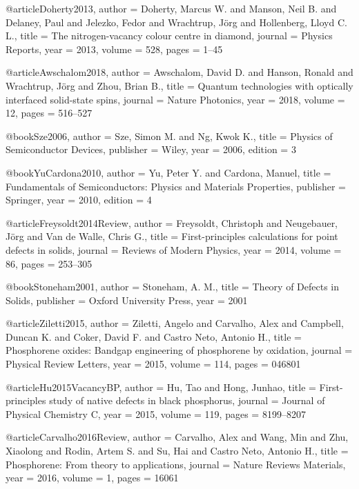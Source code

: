 @article{Doherty2013,
  author = {Doherty, Marcus W. and Manson, Neil B. and Delaney, Paul and Jelezko, Fedor and Wrachtrup, J{\"o}rg and Hollenberg, Lloyd C. L.},
  title = {The nitrogen-vacancy colour centre in diamond},
  journal = {Physics Reports},
  year = {2013},
  volume = {528},
  pages = {1--45}
}

@article{Awschalom2018,
  author = {Awschalom, David D. and Hanson, Ronald and Wrachtrup, J{\"o}rg and Zhou, Brian B.},
  title = {Quantum technologies with optically interfaced solid-state spins},
  journal = {Nature Photonics},
  year = {2018},
  volume = {12},
  pages = {516--527}
}


@book{Sze2006,
  author = {Sze, Simon M. and Ng, Kwok K.},
  title = {Physics of Semiconductor Devices},
  publisher = {Wiley},
  year = {2006},
  edition = {3}
}

@book{YuCardona2010,
  author = {Yu, Peter Y. and Cardona, Manuel},
  title = {Fundamentals of Semiconductors: Physics and Materials Properties},
  publisher = {Springer},
  year = {2010},
  edition = {4}
}

@article{Freysoldt2014Review,
  author = {Freysoldt, Christoph and Neugebauer, J{\"o}rg and Van de Walle, Chris G.},
  title = {First-principles calculations for point defects in solids},
  journal = {Reviews of Modern Physics},
  year = {2014},
  volume = {86},
  pages = {253--305}
}


@book{Stoneham2001,
  author = {Stoneham, A. M.},
  title = {Theory of Defects in Solids},
  publisher = {Oxford University Press},
  year = {2001}
}

@article{Ziletti2015,
  author = {Ziletti, Angelo and Carvalho, Alex and Campbell, Duncan K. and Coker, David F. and Castro Neto, Antonio H.},
  title = {Phosphorene oxides: Bandgap engineering of phosphorene by oxidation},
  journal = {Physical Review Letters},
  year = {2015},
  volume = {114},
  pages = {046801}
}

@article{Hu2015VacancyBP,
  author = {Hu, Tao and Hong, Junhao},
  title = {First-principles study of native defects in black phosphorus},
  journal = {Journal of Physical Chemistry C},
  year = {2015},
  volume = {119},
  pages = {8199--8207}
}

@article{Carvalho2016Review,
  author = {Carvalho, Alex and Wang, Min and Zhu, Xiaolong and Rodin, Artem S. and Su, Hai and Castro Neto, Antonio H.},
  title = {Phosphorene: From theory to applications},
  journal = {Nature Reviews Materials},
  year = {2016},
  volume = {1},
  pages = {16061}
}

